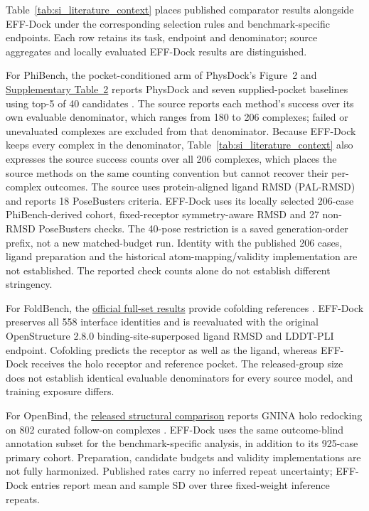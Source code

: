 \documentclass{article}
\newcommand{\citep}[1]{\cite{#1}}
\begin{document}
Table~\ref{tab:si_literature_context} places published comparator results alongside EFF-Dock under the corresponding selection rules and benchmark-specific endpoints. Each row retains its task, endpoint and denominator; source aggregates and locally evaluated EFF-Dock results are distinguished.

For PhiBench, the pocket-conditioned arm of PhysDock's Figure~2 and \href{https://assets-eu.researchsquare.com/files/rs-6600109/v1/7a2257127f9a0844b44586e0.pdf}{Supplementary Table~2} reports PhysDock and seven supplied-pocket baselines using top-5 of 40 candidates \citep{zhang2025physdock}. The source reports each method's success over its own evaluable denominator, which ranges from 180 to 206 complexes; failed or unevaluated complexes are excluded from that denominator. Because EFF-Dock keeps every complex in the denominator, Table~\ref{tab:si_literature_context} also expresses the source success counts over all 206 complexes, which places the source methods on the same counting convention but cannot recover their per-complex outcomes. The source uses protein-aligned ligand RMSD (PAL-RMSD) and reports 18 PoseBusters criteria. EFF-Dock uses its locally selected 206-case PhiBench-derived cohort, fixed-receptor symmetry-aware RMSD and 27 non-RMSD PoseBusters checks. The 40-pose restriction is a saved generation-order prefix, not a new matched-budget run. Identity with the published 206 cases, ligand preparation and the historical atom-mapping/validity implementation are not established. The reported check counts alone do not establish different stringency.

For FoldBench, the \href{https://github.com/BEAM-Labs/FoldBench/blob/4273f6877d82bd0b2fa476d1b2f34d121cbccc70/README.md}{official full-set results} provide cofolding references \citep{xu2026foldbench}. EFF-Dock preserves all 558 interface identities and is reevaluated with the original OpenStructure 2.8.0 binding-site-superposed ligand RMSD and LDDT-PLI endpoint. Cofolding predicts the receptor as well as the ligand, whereas EFF-Dock receives the holo receptor and reference pocket. The released-group size does not establish identical evaluable denominators for every source model, and training exposure differs.

For OpenBind, the \href{https://github.com/OpenBind-Consortium/EV-A71_2A_benchmark/tree/be4405f3abdf7a933bc0c70ad14b7c6fd3bc8779}{released structural comparison} reports GNINA holo redocking on 802 curated follow-on complexes \citep{openbind2026eva71}. EFF-Dock uses the same outcome-blind annotation subset for the benchmark-specific analysis, in addition to its 925-case primary cohort. Preparation, candidate budgets and validity implementations are not fully harmonized. Published rates carry no inferred repeat uncertainty; EFF-Dock entries report mean and sample SD over three fixed-weight inference repeats.
\end{document}
